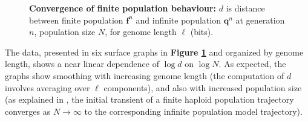 \begin{figure}[htp]
\begin{center}
\hspace{5pt}
\caption[\textbf{Convergence of finite population behaviour}]{\textbf{Convergence of finite population behaviour:} $d$ is
  distance between finite population ${\bm f}^n$ and infinite
  population ${\bm q}^n$ at generation $n$, population size $N$, for
  genome length $\ell$ (bits).}
\label{convergence}
\end{center}
\end{figure}

The data, presented in six surface graphs in {\bf Figure \ref{convergence}} and organized by
genome length, shows a near linear dependence of $\log d$ on $\log N$.
As expected, the graphs show smoothing with increasing genome length
(the computation of $d$ involves averaging over $\ell$ components),
and also with increased population size (as explained in
\cite{Vose1999}, the initial transient of a finite haploid population
trajectory converges as $N \rightarrow \infty$ to the corresponding
infinite population model trajectory).

